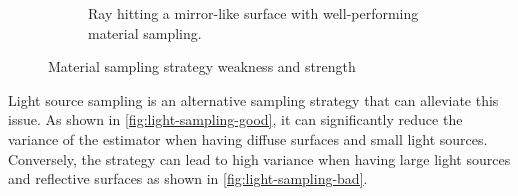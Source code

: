 \begin{figure}[H]
\begin{subfigure}[t]{0.45\textwidth}
    \caption{Ray hitting a mirror-like surface with well-performing material sampling.}
    \label{fig:material-sampling-good}
  \end{subfigure}
  \caption{Material sampling strategy weakness and strength}
  \label{fig:material-sampling}
\end{figure}

Light source sampling is an alternative sampling strategy that can alleviate this issue. As shown in \autoref{fig:light-sampling-good}, it can significantly reduce the variance of the estimator when having diffuse surfaces and small light sources. Conversely, the strategy can lead to high variance when having large light sources and reflective surfaces as shown in \autoref{fig:light-sampling-bad}.

